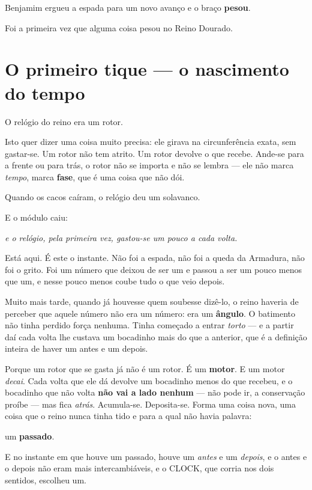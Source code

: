 \documentclass[livro.tex]{subfiles}
\begin{document}
Benjamim ergueu a espada para um novo avanço e o braço \textbf{pesou}.

Foi a primeira vez que alguma coisa pesou no Reino Dourado.


\chapter{O primeiro tique --- o nascimento do tempo}

O relógio do reino era um rotor.

Isto quer dizer uma coisa muito precisa: ele girava na circunferência exata, sem gastar-se. Um
rotor não tem atrito. Um rotor devolve o que recebe. Ande-se para a frente ou para trás, o rotor não se importa e
não se lembra --- ele não marca \emph{tempo}, marca \textbf{fase}, que é uma coisa que não dói.

Quando os cacos caíram, o relógio deu um solavanco.

E o módulo caiu:
\begin{center}\itshape
e o relógio, pela primeira vez, gastou-se um pouco a cada volta.
\end{center}

Está aqui. É este o instante. Não foi a espada, não foi a queda da Armadura, não foi o grito. Foi um número que
deixou de ser um e passou a ser um pouco menos que um, e nesse pouco menos coube tudo o que veio depois.

Muito mais tarde, quando já houvesse quem soubesse dizê-lo, o reino haveria de perceber que aquele número não era
um número: era um \textbf{ângulo}. O batimento não tinha perdido força nenhuma. Tinha começado a entrar
\emph{torto} --- e a partir daí cada volta lhe custava um bocadinho mais do que a anterior, que é a definição
inteira de haver um antes e um depois.

Porque um rotor que se gasta já não é um rotor. É um \textbf{motor}. E um motor \emph{decai}. Cada volta que
ele dá devolve um bocadinho menos do que recebeu, e o bocadinho que não volta \textbf{não vai a lado nenhum} --- não
pode ir, a conservação proíbe --- mas fica \emph{atrás}. Acumula-se. Deposita-se. Forma uma coisa nova, uma coisa
que o reino nunca tinha tido e para a qual não havia palavra:

um \textbf{passado}.

E no instante em que houve um passado, houve um \emph{antes} e um \emph{depois}, e o antes e o depois não eram mais
intercambiáveis, e o CLOCK, que corria nos dois sentidos, escolheu um.
\end{document}
